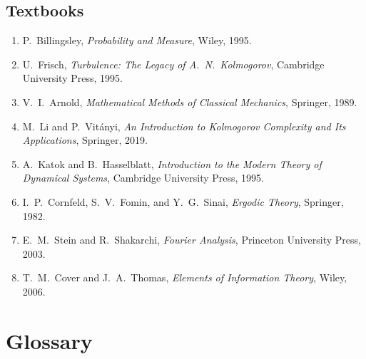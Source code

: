 \subsection*{Textbooks}
\begin{enumerate}
    \item P.\ Billingsley, \textit{Probability and Measure}, Wiley, 1995.
    \item U.\ Frisch, \textit{Turbulence: The Legacy of A.\ N.\ Kolmogorov}, Cambridge University Press, 1995.
    \item V.\ I.\ Arnold, \textit{Mathematical Methods of Classical Mechanics}, Springer, 1989.
    \item M.\ Li and P.\ Vit{\'a}nyi, \textit{An Introduction to Kolmogorov Complexity and Its Applications}, Springer, 2019.
    \item A.\ Katok and B.\ Hasselblatt, \textit{Introduction to the Modern Theory of Dynamical Systems}, Cambridge University Press, 1995.
    \item I.\ P.\ Cornfeld, S.\ V.\ Fomin, and Y.\ G.\ Sinai, \textit{Ergodic Theory}, Springer, 1982.
    \item E.\ M.\ Stein and R.\ Shakarchi, \textit{Fourier Analysis}, Princeton University Press, 2003.
    \item T.\ M.\ Cover and J.\ A.\ Thomas, \textit{Elements of Information Theory}, Wiley, 2006.
\end{enumerate}

\section*{Glossary}

